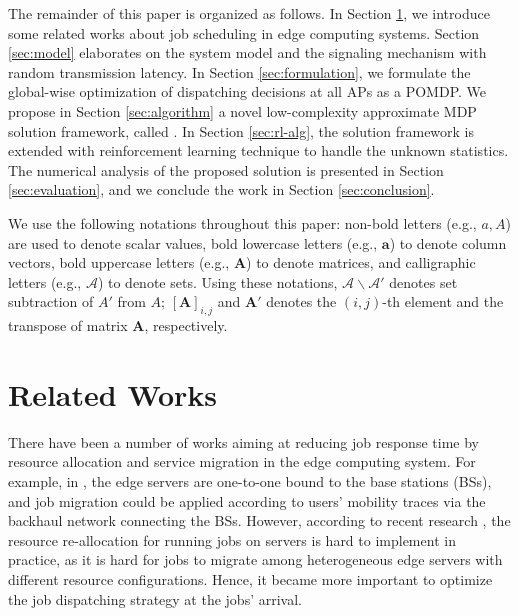 The remainder of this paper is organized as follows.
In Section \ref{sec:review}, we introduce some related works about job scheduling in edge computing systems.
Section \ref{sec:model} elaborates on the system model and the signaling mechanism with random transmission latency.
In Section \ref{sec:formulation}, we formulate the global-wise optimization of dispatching decisions at all APs as a POMDP.
We propose in Section \ref{sec:algorithm} a novel low-complexity approximate MDP solution framework, called \algname.
In Section \ref{sec:rl-alg}, the solution framework is extended with reinforcement learning technique to handle the unknown statistics.
The numerical analysis of the proposed solution is presented in Section \ref{sec:evaluation}, and we conclude the work in Section \ref{sec:conclusion}.

We use the following notations throughout this paper: 
non-bold letters (e.g., $a, A$) are used to denote scalar values,
bold lowercase letters (e.g., $\mathbf{a}$) to denote column vectors,
bold uppercase letters (e.g., $\mathbf{A}$) to denote matrices,
and calligraphic letters (e.g., $\mathcal{A}$) to denote sets.
Using these notations, $\mathcal{A}\backslash\mathcal{A'}$ denotes set subtraction of $A'$ from $A$; $[\mathbf{A}]_{i,j}$ and $\mathbf{A}'$ denotes the $(i,j)$-th element and the transpose of matrix $\mathbf{A}$, respectively.

\section{Related Works}
\label{sec:review}
There have been a number of works aiming at reducing job response time by resource allocation and service migration in the edge computing system.
For example, in \cite{TON19-WangSq}, the edge servers are one-to-one bound to the base stations (BSs), and job migration could be applied according to users' mobility traces via the backhaul network connecting the BSs.
However, according to recent research \cite{INFOCOM19-WuC}, the resource re-allocation for running jobs on servers is hard to implement in practice, as it is hard for jobs to migrate among heterogeneous edge servers with different resource configurations.
Hence, it became more important to optimize the job dispatching strategy at the jobs' arrival.

